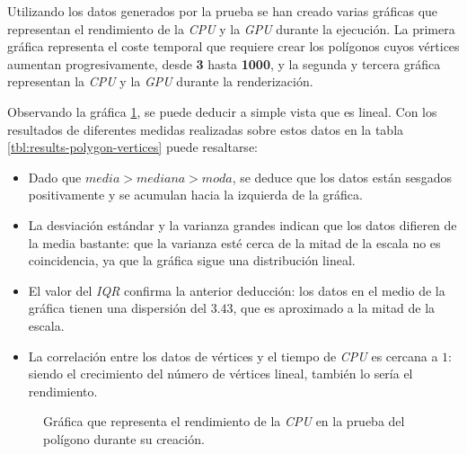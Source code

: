 Utilizando los datos generados por la prueba se han creado varias gráficas que representan el rendimiento de la \textit{CPU} y la \textit{GPU} durante la ejecución. La primera gráfica representa el coste temporal que requiere crear los polígonos cuyos vértices aumentan progresivamente, desde \textbf{3} hasta \textbf{1000}, y la segunda y tercera gráfica representan la \textit{CPU} y la \textit{GPU} durante la renderización.

Observando la gráfica \ref{fig:polygon-graph-vertices}, se puede deducir a simple vista que es lineal. Con los resultados de diferentes medidas realizadas sobre estos datos en la tabla \ref{tbl:results-polygon-vertices} puede resaltarse:

\begin{itemize}

    \item Dado que $media > mediana > moda$, se deduce que los datos están sesgados positivamente y se acumulan hacia la izquierda de la gráfica.

    \item La desviación estándar y la varianza grandes indican que los datos difieren de la media bastante: que la varianza esté cerca de la mitad de la escala no es coincidencia, ya que la gráfica sigue una distribución lineal.

    \item El valor del \textit{IQR} confirma la anterior deducción: los datos en el medio de la gráfica tienen una dispersión del $3.43$, que es aproximado a la mitad de la escala.
    
    \item La correlación entre los datos de vértices y el tiempo de \textit{CPU} es cercana a $1$: siendo el crecimiento del número de vértices lineal, también lo sería el rendimiento.

\end{itemize}

\FloatBarrier

\begin{figure}[htp]
    \centering
    
    \caption{Gráfica que representa el rendimiento de la \textit{CPU} en la prueba del polígono durante su creación.}
    \label{fig:polygon-graph-vertices}
\end{figure}



\FloatBarrier

